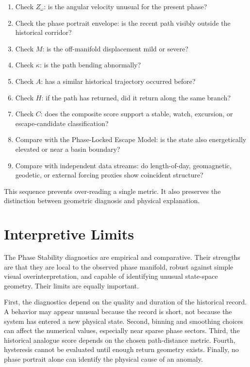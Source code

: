 \documentclass[11pt]{article}
\begin{document}
\begin{enumerate}[leftmargin=1.5em]
\item Check \(Z_{\omega}\): is the angular velocity unusual for the present phase?
\item Check the phase portrait envelope: is the recent path visibly outside the historical corridor?
\item Check \(M\): is the off-manifold displacement mild or severe?
\item Check \(\kappa\): is the path bending abnormally?
\item Check \(A\): has a similar historical trajectory occurred before?
\item Check \(H\): if the path has returned, did it return along the same branch?
\item Check \(C\): does the composite score support a stable, watch, excursion, or escape-candidate classification?
\item Compare with the Phase-Locked Escape Model: is the state also energetically elevated or near a basin boundary?
\item Compare with independent data streams: do length-of-day, geomagnetic, geodetic, or external forcing proxies show coincident structure?
\end{enumerate}

This sequence prevents over-reading a single metric. It also preserves the distinction between geometric diagnosis and physical explanation.

\section{Interpretive Limits}

The Phase Stability diagnostics are empirical and comparative. Their strengths are that they are local to the observed phase manifold, robust against simple visual overinterpretation, and capable of identifying unusual state-space geometry. Their limits are equally important.

First, the diagnostics depend on the quality and duration of the historical record. A behavior may appear unusual because the record is short, not because the system has entered a new physical state. Second, binning and smoothing choices can affect the numerical values, especially near sparse phase sectors. Third, the historical analogue score depends on the chosen path-distance metric. Fourth, hysteresis cannot be evaluated until enough return geometry exists. Finally, no phase portrait alone can identify the physical cause of an anomaly.
\end{document}
